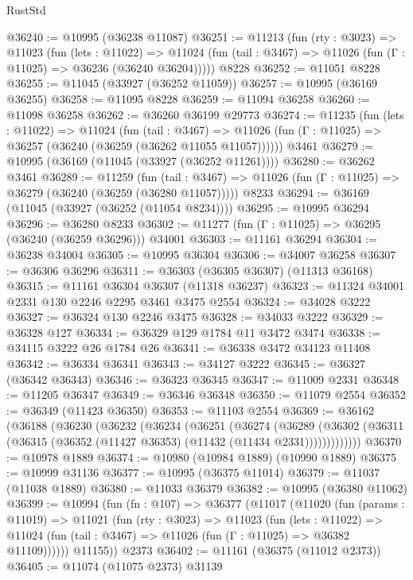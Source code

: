 \begin{lexlean}{RustStd}
\begin{coremodule}
@36240 := @10995 (@36238 @11087)
@36251 := @11213
    (fun (rty : @3023) =>
    @11023
      (fun (lets : @11022) =>
      @11024 (fun (tail : @3467) => @11026 (fun (Γ : @11025) => @36236 (@36240 @36204)))))
    @8228
@36252 := @11051 @8228
@36255 := @11045 (@33927 (@36252 @11059))
@36257 := @10995 (@36169 @36255)
@36258 := @11095 @8228
@36259 := @11094 @36258
@36260 := @11098 @36258
@36262 := @36260 @36199 @29773
@36274 := @11235
    (fun (lets : @11022) =>
    @11024
      (fun (tail : @3467) =>
      @11026 (fun (Γ : @11025) => @36257 (@36240 (@36259 (@36262 @11055 @11057))))))
    @3461
@36279 := @10995 (@36169 (@11045 (@33927 (@36252 @11261))))
@36280 := @36262 @3461
@36289 := @11259
    (fun (tail : @3467) => @11026 (fun (Γ : @11025) => @36279 (@36240 (@36259 (@36280 @11057)))))
    @8233
@36294 := @36169 (@11045 (@33927 (@36252 (@11054 @8234))))
@36295 := @10995 @36294
@36296 := @36280 @8233
@36302 := @11277 (fun (Γ : @11025) => @36295 (@36240 (@36259 @36296))) @34001
@36303 := @11161 @36294
@36304 := @36238 @34004
@36305 := @10995 @36304
@36306 := @34007 @36258
@36307 := @36306 @36296
@36311 := @36303 (@36305 @36307) (@11313 @36168)
@36315 := @11161 @36304 @36307 (@11318 @36237)
@36323 := @11324 @34001 @2331 @130 @2246 @2295 @3461 @3475 @2554
@36324 := @34028 @3222
@36327 := @36324 @130 @2246 @3475
@36328 := @34033 @3222
@36329 := @36328 @127
@36334 := @36329 @129 @1784 @11 @3472 @3474
@36338 := @34115 @3222 @26 @1784 @26
@36341 := @36338 @3472 @34123 @11408
@36342 := @36334 @36341
@36343 := @34127 @3222
@36345 := @36327 (@36342 @36343)
@36346 := @36323 @36345
@36347 := @11009 @2331
@36348 := @11205 @36347
@36349 := @36346 @36348
@36350 := @11079 @2554
@36352 := @36349 (@11423 @36350)
@36353 := @11103 @2554
@36369 := @36162
    (@36188
      (@36230
        (@36232
          (@36234
            (@36251
              (@36274
                (@36289
                  (@36302 (@36311 (@36315 (@36352 (@11427 @36353) (@11432 (@11434 @2331)))))))))))))
@36370 := @10978 @1889
@36374 := @10980 (@10984 @1889) (@10990 @1889)
@36375 := @10999 @31136
@36377 := @10995 (@36375 @11014)
@36379 := @11037 (@11038 @1889)
@36380 := @11033 @36379
@36382 := @10995 (@36380 @11062)
@36399 := @10994
    (fun (fn : @107) =>
    @36377
      (@11017
        (@11020
          (fun (params : @11019) =>
          @11021
            (fun (rty : @3023) =>
            @11023
              (fun (lets : @11022) =>
              @11024 (fun (tail : @3467) => @11026 (fun (Γ : @11025) => @36382 @11109))))))
        @11155))
    @2373
@36402 := @11161 (@36375 (@11012 @2373))
@36405 := @11074 (@11075 @2373) @31139

\end{coremodule}
\end{lexlean}
